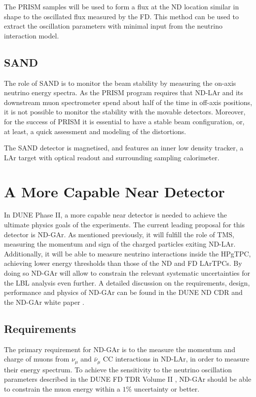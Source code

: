 The PRISM samples will be used to form a flux at the ND location similar in shape to the oscillated flux measured by the FD. This method can be used to extract the oscillation parameters with minimal input from the neutrino interaction model.

\subsection{SAND}

The role of SAND is to monitor the beam stability by measuring the on-axis neutrino energy spectra. As the PRISM program requires that ND-LAr and its downstream muon spectrometer spend about half of the time in off-axis positions, it is not possible to monitor the stability with the movable detectors. Moreover, for the success of PRISM it is essential to have a stable beam configuration, or, at least, a quick assessment and modeling of the distortions.

The SAND detector is magnetised, and features an inner low density tracker, a LAr target with optical readout and surrounding sampling calorimeter.

\section{A More Capable Near Detector}\label{sec:mcnd}

In DUNE Phase II, a more capable near detector is needed to achieve the ultimate physics goals of the experiments. The current leading proposal for this detector is ND-GAr. As mentioned previously, it will fulfill the role of TMS, measuring the momentum and sign of the charged particles exiting ND-LAr. Additionally, it will be able to measure neutrino interactions inside the HPgTPC, achieving lower energy thresholds than those of the ND and FD LArTPCs. By doing so ND-GAr will allow to constrain the relevant systematic uncertainties for the LBL analysis even further. A detailed discussion on the requirements, design, performance and physics of ND-GAr can be found in the DUNE ND CDR \cite{DUNE2021NDCDR} and the ND-GAr white paper \cite{DUNE2022GArWhite}.

\subsection{Requirements}

The primary requirement for ND-GAr is to the measure the momentum and charge of muons from $\nu_{\mu}$ and $\bar{\nu}_{\mu}$ CC interactions in ND-LAr, in order to measure their energy spectrum. To achieve the sensitivity to the neutrino oscillation parameters described in the DUNE FD TDR Volume II \cite{DUNE2020TDR2}, ND-GAr should be able to constrain the muon energy within a $1\%$ uncertainty or better.

